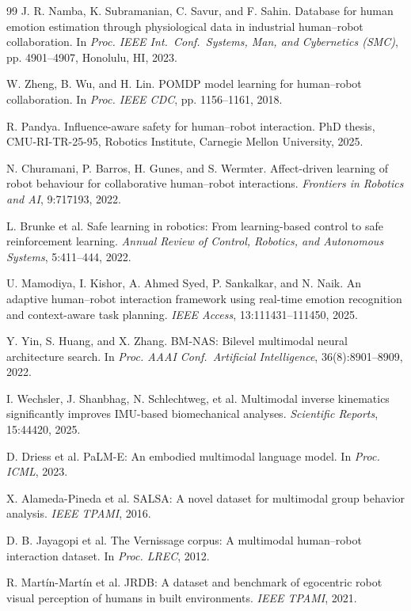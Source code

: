 \documentclass{article}
\begin{document}
\begin{thebibliography}{99}
 J. R. Namba, K. Subramanian, C. Savur, and F. Sahin. Database for human emotion estimation through physiological data in industrial human--robot collaboration. In \emph{Proc. IEEE Int.\ Conf.\ Systems, Man, and Cybernetics (SMC)}, pp. 4901--4907, Honolulu, HI, 2023.

 W. Zheng, B. Wu, and H. Lin. POMDP model learning for human--robot collaboration. In \emph{Proc. IEEE CDC}, pp. 1156--1161, 2018.

 R. Pandya. Influence-aware safety for human--robot interaction. PhD thesis, CMU-RI-TR-25-95, Robotics Institute, Carnegie Mellon University, 2025.

 N. Churamani, P. Barros, H. Gunes, and S. Wermter. Affect-driven learning of robot behaviour for collaborative human--robot interactions. \emph{Frontiers in Robotics and AI}, 9:717193, 2022.

 L. Brunke et al. Safe learning in robotics: From learning-based control to safe reinforcement learning. \emph{Annual Review of Control, Robotics, and Autonomous Systems}, 5:411--444, 2022.

 U. Mamodiya, I. Kishor, A. Ahmed Syed, P. Sankalkar, and N. Naik. An adaptive human--robot interaction framework using real-time emotion recognition and context-aware task planning. \emph{IEEE Access}, 13:111431--111450, 2025.

 Y. Yin, S. Huang, and X. Zhang. BM-NAS: Bilevel multimodal neural architecture search. In \emph{Proc. AAAI Conf.\ Artificial Intelligence}, 36(8):8901--8909, 2022.

 I. Wechsler, J. Shanbhag, N. Schlechtweg, et al. Multimodal inverse kinematics significantly improves IMU-based biomechanical analyses. \emph{Scientific Reports}, 15:44420, 2025.

 D. Driess et al. PaLM-E: An embodied multimodal language model. In \emph{Proc. ICML}, 2023.

 X. Alameda-Pineda et al. SALSA: A novel dataset for multimodal group behavior analysis. \emph{IEEE TPAMI}, 2016.

 D. B. Jayagopi et al. The Vernissage corpus: A multimodal human--robot interaction dataset. In \emph{Proc. LREC}, 2012.

 R. Mart\'in-Mart\'in et al. JRDB: A dataset and benchmark of egocentric robot visual perception of humans in built environments. \emph{IEEE TPAMI}, 2021.


\end{thebibliography}
\end{document}
